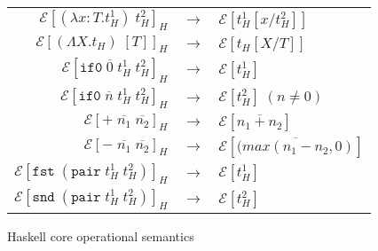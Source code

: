 \begin{figure}
\onehalfspacing
\begin{center}
\begin{tabular}{rcl}
$\mathscr{E}[(\lambda x:T.t_{H}^{1})\;t_{H}^{2}]_{H}$ & $\rightarrow$ & $\mathscr{E}[t_{H}^{1}[x/t_{H}^{2}]]$ \\
$\mathscr{E}[(\Lambda X.t_{H})\;[T]]_{H}$ & $\rightarrow$ & $\mathscr{E}[t_{H}[X/T]]$ \\
$\mathscr{E}[\mathtt{if0}\;\overline{0}\;t_{H}^{1}\;t_{H}^{2}]_{H}$ & $\rightarrow$ & $\mathscr{E}[t_{H}^{1}]$ \\
$\mathscr{E}[\mathtt{if0}\;\overline{n}\;t_{H}^{1}\;t_{H}^{2}]_{H}$ & $\rightarrow$ & $\mathscr{E}[t_{H}^{2}]\;(n\neq0)$ \\
$\mathscr{E}[+\;\overline{n_{1}}\;\overline{n_{2}}]_{H}$ & $\rightarrow$ & $\mathscr{E}[\overline{n_{1}+n_{2}}]$ \\
$\mathscr{E}[-\;\overline{n_{1}}\;\overline{n_{2}}]_{H}$ & $\rightarrow$ & $\mathscr{E}[\overline{(max(n_{1}-n_{2},0)}]$ \\
$\mathscr{E}[\mathtt{fst}\;(\mathtt{pair}\;t_{H}^{1}\;t_{H}^{2})]_{H}$ & $\rightarrow$ & $\mathscr{E}[t_{H}^{1}]$ \\
$\mathscr{E}[\mathtt{snd}\;(\mathtt{pair}\;t_{H}^{1}\;t_{H}^{2})]_{H}$ & $\rightarrow$ & $\mathscr{E}[t_{H}^{2}]$
\end{tabular}
\end{center}
\caption{Haskell core operational semantics}
\label{fig:hcos}
\end{figure}